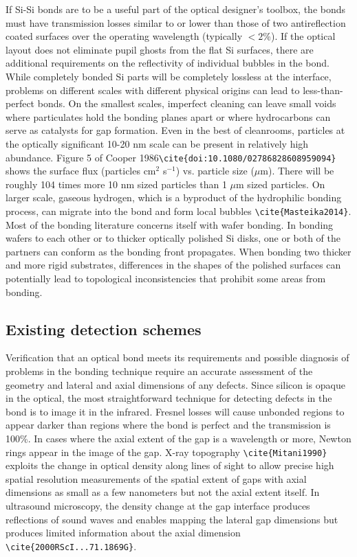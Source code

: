 \documentclass[osajnl,preprint,showpacs,superscriptaddress,12pt]{revtex4-1} %
\begin{document}
If Si-Si bonds are to be a useful part of the optical designer's toolbox, the bonds must have transmission losses similar to or lower than those of two antireflection coated surfaces over the operating wavelength (typically $< 2$\%).  If the optical layout does not eliminate pupil ghosts from the flat Si surfaces, there are additional requirements on the reflectivity of individual bubbles in the bond. While completely bonded Si parts will be completely lossless at the interface, problems on different scales with different physical origins can lead to less-than-perfect bonds.  On the smallest scales, imperfect cleaning can leave small voids where particulates hold the bonding planes apart or where hydrocarbons can serve as catalysts for gap formation.  Even in the best of cleanrooms, particles at the optically significant 10-20 nm scale can be present in relatively high abundance. Figure 5 of Cooper 1986\verb|\cite{doi:10.1080/02786828608959094}| shows the surface flux (particles cm$^2$ s$^{-1}$) vs. particle size ($\mu$m). There will be roughly 104 times more 10 nm sized particles than 1 $\mu$m sized particles.  On larger scale, gaseous hydrogen, which is a byproduct of the hydrophilic bonding process, can migrate into the bond and form local bubbles \verb|\cite{Masteika2014}|.  Most of the bonding literature concerns itself with wafer bonding.  In bonding wafers to each other or to thicker optically polished Si disks, one or both of the partners can conform as the bonding front propagates.  When bonding two thicker and more rigid substrates, differences in the shapes of the polished surfaces can potentially lead to topological inconsistencies that prohibit some areas from bonding.

\subsection{Existing detection schemes}
Verification that an optical bond meets its requirements and possible diagnosis of problems in the bonding technique require an accurate assessment of the geometry and lateral and axial dimensions of any defects.  Since silicon is opaque in the optical, the most straightforward technique for detecting defects in the bond is to image it in the infrared.  Fresnel losses will cause unbonded regions to appear darker than regions where the bond is perfect and the transmission is 100\%.  In cases where the axial extent of the gap is a wavelength or more, Newton rings appear in the image of the gap.  X-ray topography \verb|\cite{Mitani1990}| exploits the change in optical density along lines of sight to allow precise high spatial resolution measurements of the spatial extent of gaps with axial dimensions as small as a few nanometers but not the axial extent itself. In ultrasound microscopy, the density change at the gap interface produces reflections of sound waves and enables mapping the lateral gap dimensions but produces limited information about the axial dimension \verb|\cite{2000RScI...71.1869G}|.
\end{document}

